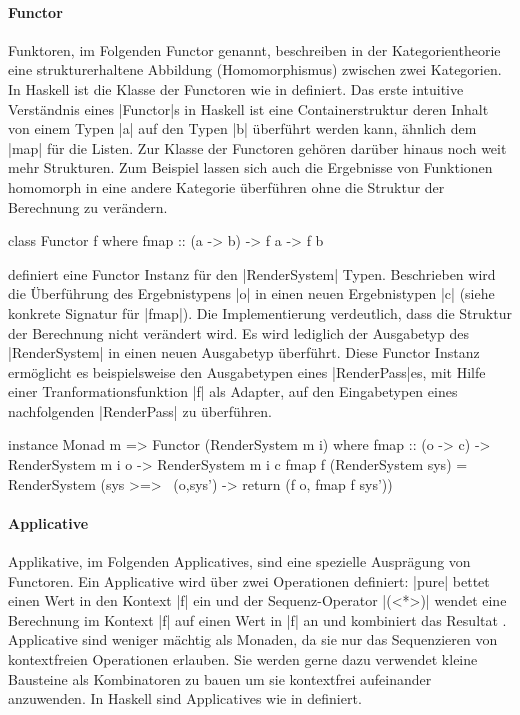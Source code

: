
\paragraph{Functor} 
Funktoren, im Folgenden Functor genannt, beschreiben in der Kategorientheorie eine strukturerhaltene Abbildung (Homomorphismus) zwischen zwei Kategorien. In Haskell ist die Klasse der Functoren wie in  definiert. Das erste intuitive Verständnis eines |Functor|s in Haskell ist eine Containerstruktur deren Inhalt von einem Typen |a| auf den Typen |b| überführt werden kann, ähnlich dem |map| für die Listen. Zur Klasse der Functoren gehören darüber hinaus noch weit mehr Strukturen. Zum Beispiel lassen sich auch die Ergebnisse von Funktionen homomorph in eine andere Kategorie überführen ohne die Struktur der Berechnung zu verändern.

\begin{haskell}[label={lst:class-functor},caption={Functor Klasse\protect\footnotemark},nolol]
class Functor f where
  fmap :: (a -> b) -> f a -> f b 
\end{haskell}

 definiert eine Functor Instanz für den |RenderSystem| Typen. Beschrieben wird die Überführung des Ergebnistypens |o| in einen neuen Ergebnistypen |c| (siehe konkrete Signatur für |fmap|). Die Implementierung verdeutlich, dass die Struktur der Berechnung nicht verändert wird. Es wird lediglich der Ausgabetyp des |RenderSystem| in einen neuen Ausgabetyp überführt. Diese Functor Instanz ermöglicht es beispielsweise den Ausgabetypen eines |RenderPass|es, mit Hilfe einer Tranformationsfunktion |f| als Adapter, auf den Eingabetypen eines nachfolgenden |RenderPass| zu überführen.

\begin{haskell}[label={lst:rendersystem-functor},caption={Functor Instanz für RenderSystem}]
instance Monad m => Functor (RenderSystem m i) where
  fmap :: (o -> c) -> RenderSystem m i o -> RenderSystem m i c
  fmap f (RenderSystem sys) = RenderSystem (sys >=> \ (o,sys') -> return (f o, fmap f sys'))
\end{haskell}



\paragraph{Applicative}
Applikative, im Folgenden Applicatives, sind eine spezielle Ausprägung von Functoren. Ein Applicative wird über zwei Operationen definiert: |pure| bettet einen Wert in den Kontext |f| ein und der Sequenz-Operator |(<*>)| wendet eine Berechnung im Kontext |f| auf einen Wert in |f| an und kombiniert das Resultat \parencite[Kapitel~2]{Paterson2008}. Applicative sind weniger mächtig als Monaden, da sie nur das Sequenzieren von kontextfreien Operationen erlauben. Sie werden gerne dazu verwendet kleine Bausteine als Kombinatoren zu bauen um sie kontextfrei aufeinander anzuwenden. In Haskell sind Applicatives wie in  definiert.

